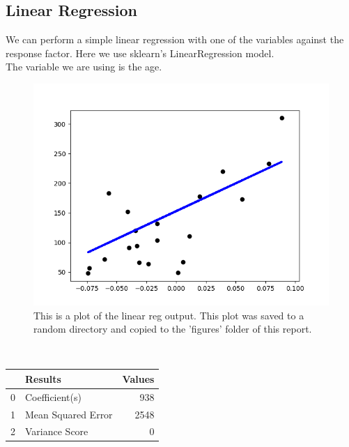 \subsection{Linear Regression}%
\label{subsec:Linear Regression}%
We can perform a simple linear regression with one of the 
variables against the response factor.
Here we use sklearn's LinearRegression model.\\
The variable we are using is the age. 

\begin{figure}[!ht]%
\centering%
\includegraphics[scale=0.6]{../figures/Figure1.png}%
\linebreak%
\caption{This is a plot of the linear reg output. This plot was saved to a random directory and copied to the 'figures' folder of this report.}
\end{figure}
\\    
\begin{tabular}{llr}
\toprule
{} &             Results &  Values \\
\midrule
0 &      Coefficient(s) &     938 \\
1 &  Mean Squared Error &    2548 \\
2 &      Variance Score &       0 \\
\bottomrule
\end{tabular}
\\\caption{Results of the Logisitic Regression}


\lipsum[5]
